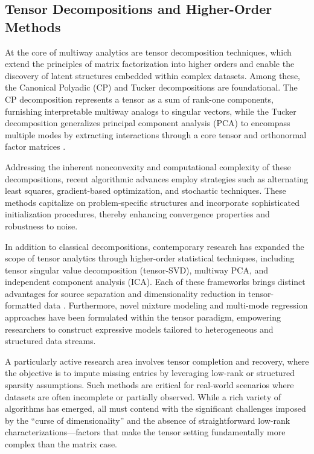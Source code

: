\documentclass[sigconf]{acmart}
\begin{document}
\subsection{Tensor Decompositions and Higher-Order Methods}

At the core of multiway analytics are tensor decomposition techniques, which extend the principles of matrix factorization into higher orders and enable the discovery of latent structures embedded within complex datasets. Among these, the Canonical Polyadic (CP) and Tucker decompositions are foundational. The CP decomposition represents a tensor as a sum of rank-one components, furnishing interpretable multiway analogs to singular vectors, while the Tucker decomposition generalizes principal component analysis (PCA) to encompass multiple modes by extracting interactions through a core tensor and orthonormal factor matrices \cite{ref104}. 

Addressing the inherent nonconvexity and computational complexity of these decompositions, recent algorithmic advances employ strategies such as alternating least squares, gradient-based optimization, and stochastic techniques. These methods capitalize on problem-specific structures and incorporate sophisticated initialization procedures, thereby enhancing convergence properties and robustness to noise.

In addition to classical decompositions, contemporary research has expanded the scope of tensor analytics through higher-order statistical techniques, including tensor singular value decomposition (tensor-SVD), multiway PCA, and independent component analysis (ICA). Each of these frameworks brings distinct advantages for source separation and dimensionality reduction in tensor-formatted data \cite{ref104}. Furthermore, novel mixture modeling and multi-mode regression approaches have been formulated within the tensor paradigm, empowering researchers to construct expressive models tailored to heterogeneous and structured data streams.

A particularly active research area involves tensor completion and recovery, where the objective is to impute missing entries by leveraging low-rank or structured sparsity assumptions. Such methods are critical for real-world scenarios where datasets are often incomplete or partially observed. While a rich variety of algorithms has emerged, all must contend with the significant challenges imposed by the ``curse of dimensionality'' and the absence of straightforward low-rank characterizations---factors that make the tensor setting fundamentally more complex than the matrix case.
\end{document}
